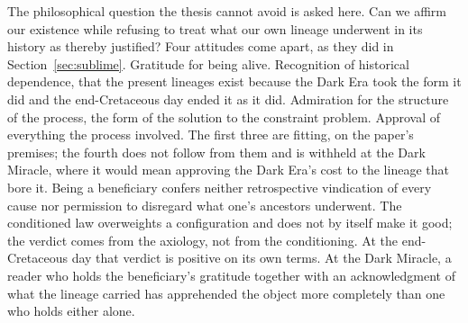 The philosophical question the thesis cannot avoid is asked here. Can we
affirm our existence while refusing to treat what our own lineage underwent
in its history as thereby justified? Four attitudes come apart, as they did
in Section~\ref{sec:sublime}. Gratitude for being alive. Recognition of
historical dependence, that the present lineages exist because the Dark Era
took the form it did and the end-Cretaceous day ended it as it did.
Admiration for the structure of the process, the form of the solution to the
constraint problem. Approval of everything the process involved. The first
three are fitting, on the paper's premises; the fourth does not follow from
them and is withheld at the Dark Miracle, where it would mean approving the
Dark Era's cost to the lineage that bore it. Being a beneficiary confers
neither retrospective vindication of every cause nor permission to disregard
what one's ancestors underwent. The conditioned law overweights a
configuration and does not by itself make it good; the verdict comes from the
axiology, not from the conditioning. At the end-Cretaceous day that verdict is
positive on its own terms. At the Dark Miracle, a reader who holds the
beneficiary's gratitude together with an acknowledgment of what the lineage
carried has apprehended the object more completely than one who holds either
alone.
